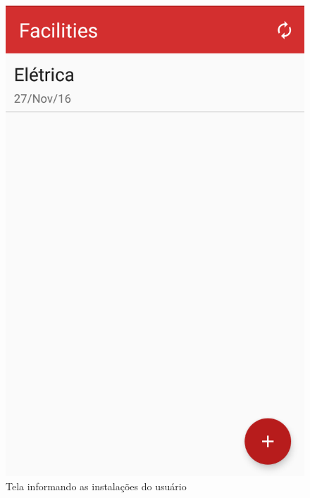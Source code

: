 \begin{figure}[H]
\begin{minipage}[b]{0.4\textwidth}
    \includegraphics[width=\textwidth]{imagens/screenshots/facilities.png}
    \caption{Tela informando as instalações do usuário}
  \end{minipage}
\end{figure}

